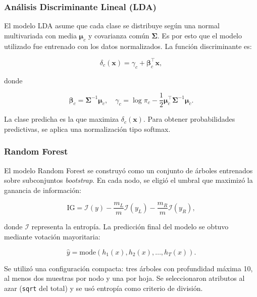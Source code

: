 \subsubsection{Análisis Discriminante Lineal (LDA)}

El modelo LDA asume que cada clase se distribuye según una normal multivariada con media \(\boldsymbol{\mu}_c\) y covarianza común \(\boldsymbol{\Sigma}\). Es por esto que el modelo utilizado fue entrenado con los datos normalizados. La función discriminante es:

\begin{equation}
\delta_c(\mathbf{x}) = \gamma_c + \boldsymbol{\beta}_c^\top \mathbf{x},
\end{equation}

donde

\begin{equation}
\boldsymbol{\beta}_c = \boldsymbol{\Sigma}^{-1} \boldsymbol{\mu}_c, \quad
\gamma_c = \log \pi_c - \frac{1}{2} \boldsymbol{\mu}_c^\top \boldsymbol{\Sigma}^{-1} \boldsymbol{\mu}_c.
\end{equation}

La clase predicha es la que maximiza \(\delta_c(\mathbf{x})\). Para obtener probabilidades predictivas, se aplica una normalización tipo softmax.


\subsubsection{Random Forest}

El modelo Random Forest se construyó como un conjunto de árboles entrenados sobre subconjuntos \textit{bootstrap}. En cada nodo, se eligió el umbral que maximizó la ganancia de información:

\begin{equation}
\mathrm{IG} = \mathcal{I}(y) - \frac{m_L}{m}\mathcal{I}(y_L) - \frac{m_R}{m}\mathcal{I}(y_R),
\end{equation}

donde \(\mathcal{I}\) representa la entropía. La predicción final del modelo se obtuvo mediante votación mayoritaria:

\begin{equation}
\hat{y} = \mathrm{mode}(h_1(x), h_2(x), \dots, h_T(x)).
\end{equation}

Se utilizó una configuración compacta: tres árboles con profundidad máxima 10, al menos dos muestras por nodo y una por hoja. Se seleccionaron atributos al azar (\texttt{sqrt} del total) y se usó entropía como criterio de división.



